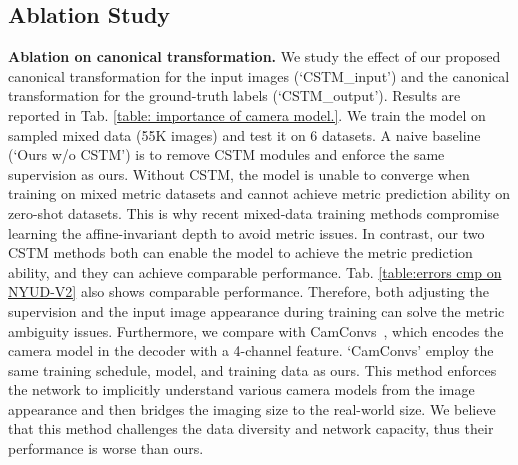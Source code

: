 \subsection{Ablation Study}
\noindent\textbf{Ablation on canonical transformation.}
We study the effect of our proposed canonical transformation for the input images (`CSTM\_input') and the canonical transformation for the ground-truth labels (`CSTM\_output'). Results are reported in  Tab. \ref{table: importance of camera model.}. We train the model on sampled mixed data (55K images) and test it on 6 datasets. A naive baseline (`Ours w/o CSTM') is to remove CSTM modules and enforce the same supervision as ours. Without CSTM, the model is unable to converge when training on mixed metric datasets and cannot achieve metric prediction ability on zero-shot datasets. This is why recent mixed-data training methods compromise learning the affine-invariant depth to avoid metric issues. In contrast, our two CSTM methods both can enable the model to achieve the metric prediction ability, and they can achieve comparable performance. Tab. \ref{table:errors cmp on NYUD-V2} also shows comparable performance. Therefore, both adjusting the supervision and the input image appearance during training can solve the metric ambiguity issues. Furthermore, we compare with CamConvs~\cite{facil2019cam}, which encodes the camera model in the decoder with a 4-channel feature. `CamConvs' employ the same training schedule, model, and training data as ours. This method enforces the network to implicitly understand various camera models from the image appearance and then bridges the imaging size to the real-world size. We believe that this method challenges the data diversity and network capacity, thus their performance is worse than ours. 


